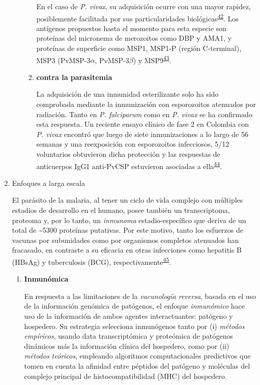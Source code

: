\documentclass[a4paper]{article}
\begin{document}
\begin{enumerate}
\begin{enumerate}
\begin{enumerate}
      En el caso de \emph{P. vivax}, su adquisición ocurre con una mayor
      rapidez, posiblemente facilitada por sus particularidades
      biológicas\textsuperscript{\protect\hyperlink{ref-mueller2013}{42}}.
      Los antígenos propuestos hasta el momento para esta especie son
      proteínas del micronema de merozoitos como DBP y AMA1, y proteínas
      de superficie como MSP1, MSP1-P (región C-terminal), MSP3
      (PvMSP-3\(\alpha\), PvMSP-3\(\beta\)) y
      MSP9\textsuperscript{\protect\hyperlink{ref-lopez2017}{43}}. 
    \item
      \textbf{contra la parasitemia}

      La adquisición de una inmunidad esterilizante solo ha sido
      comprobada mediante la inmunización con esporozoitos atenuados por
      radiación. Tanto en \emph{P. falciparum} como en \emph{P. vivax}
      se ha confirmado esta respuesta. Un reciente ensayo clínico de
      fase 2 en Colombia con \emph{P. vivax} encontró que luego de siete
      inmunizaciones a lo largo de 56 semanas y una reexposición con
      esporozoitos infecciosos, 5/12 voluntarios obtuvieron dicha
      protección y las respuestas de anticuerpos IgG1 anti-PvCSP
      estuvieron asociadas a
      ella\textsuperscript{\protect\hyperlink{ref-arevalo2016spz}{44}}. 
    \end{enumerate}
  \end{enumerate}
\item
  Enfoques a larga escala

  El parásito de la malaria, al tener un ciclo de vida complejo con
  múltiples estadios de desarrollo en el humano, posee también un
  transcriptoma, proteoma y, por lo tanto, un \emph{inmunoma}
  estadio-específico que deriva de un total de \textasciitilde{}5300
  proteínas putativas. Por este motivo, tanto los esfuerzos de vacunas
  por subunidades como por organismos completos atenuados han fracasado,
  en contraste a su eficacia en otras infecciones como hepatitis B
  (HBsAg) y tuberculosis (BCG),
  respectivamente\textsuperscript{\protect\hyperlink{ref-immunomics2016}{45}}.

  \begin{enumerate}
  \def\labelenumii{\roman{enumii}.}
  \item
    \textbf{Inmunómica}

    En respuesta a las limitaciones de la \emph{vacunología reversa},
    basada en el uso de la información genómica de patógenos, el enfoque
    \emph{inmunómico} hace uso de la información de ambos agentes
    interactuantes: patógeno y hospedero. Su estrategia selecciona
    inmunógenos tanto por (i) \emph{métodos empíricos}, usando data
    transcriptómica y proteómica de patógenos dinámicos más la
    información clínica del hospedero, como por (ii) \emph{métodos
    teóricos}, empleando algoritmos computacionales predictivos que
    tomen en cuenta la afinidad entre péptidos del patógeno y moléculas
    del complejo principal de histocompatibilidad (MHC) del hospedero.


\end{enumerate}
\end{enumerate}
\end{document}
